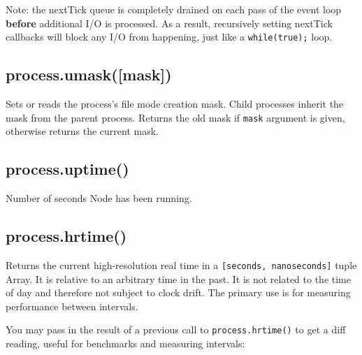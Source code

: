 Note: the nextTick queue is completely drained on each pass of the event
loop \textbf{before} additional I/O is processed. As a result,
recursively setting nextTick callbacks will block any I/O from
happening, just like a \texttt{while(true);} loop.

\subsection{process.umask({[}mask{]})}

Sets or reads the process's file mode creation mask. Child processes
inherit the mask from the parent process. Returns the old mask if
\texttt{mask} argument is given, otherwise returns the current mask.

\begin{Shaded}
\begin{Highlighting}[]
 \NormalTok{;}

\NormalTok{(} \NormalTok{+ }\NormalTok{(}\NormalTok{) +}
             \NormalTok{+ }\NormalTok{(}\NormalTok{));}
\end{Highlighting}
\end{Shaded}

\subsection{process.uptime()}

Number of seconds Node has been running.

\subsection{process.hrtime()}

Returns the current high-resolution real time in a
\texttt{{[}seconds, nanoseconds{]}} tuple Array. It is relative to an
arbitrary time in the past. It is not related to the time of day and
therefore not subject to clock drift. The primary use is for measuring
performance between intervals.

You may pass in the result of a previous call to
\texttt{process.hrtime()} to get a diff reading, useful for benchmarks
and measuring intervals:

